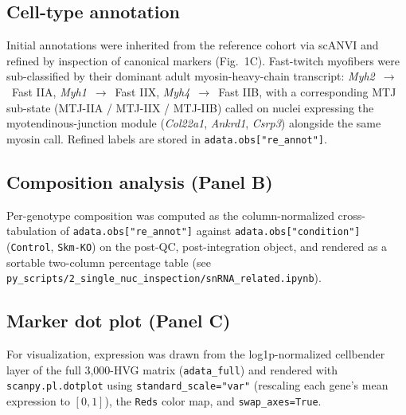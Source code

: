 \subsection*{Cell-type annotation}
Initial annotations were inherited from the reference cohort via scANVI and refined by inspection of canonical markers (Fig.~1C). Fast-twitch myofibers were sub-classified by their dominant adult myosin-heavy-chain transcript: \textit{Myh2}~$\rightarrow$~Fast IIA, \textit{Myh1}~$\rightarrow$~Fast IIX, \textit{Myh4}~$\rightarrow$~Fast IIB, with a corresponding MTJ sub-state (MTJ-IIA / MTJ-IIX / MTJ-IIB) called on nuclei expressing the myotendinous-junction module (\textit{Col22a1}, \textit{Ankrd1}, \textit{Csrp3}) alongside the same myosin call. Refined labels are stored in \texttt{adata.obs["re\_annot"]}.

\subsection*{Composition analysis (Panel B)}
Per-genotype composition was computed as the column-normalized cross-tabulation of \texttt{adata.obs["re\_annot"]} against \texttt{adata.obs["condition"]} (\texttt{Control}, \texttt{Skm-KO}) on the post-QC, post-integration object, and rendered as a sortable two-column percentage table (see \texttt{py\_scripts/2\_single\_nuc\_inspection/snRNA\_related.ipynb}).

\subsection*{Marker dot plot (Panel C)}
For visualization, expression was drawn from the log1p-normalized cellbender layer of the full 3{,}000-HVG matrix (\texttt{adata\_full}) and rendered with \texttt{scanpy.pl.dotplot} using \texttt{standard\_scale="var"} (rescaling each gene's mean expression to $[0,1]$), the \texttt{Reds} color map, and \texttt{swap\_axes=True}.

